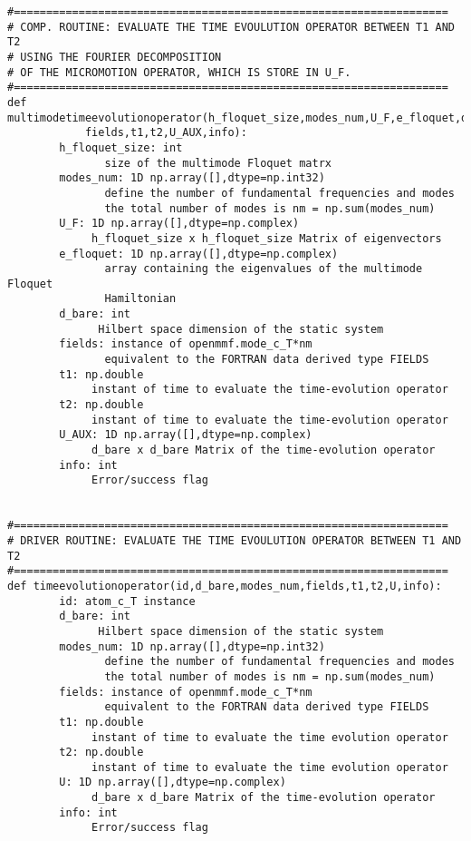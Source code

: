 \documentclass[10pt,a4paper]{article}
\begin{document}
\begin{verbatim}
#===================================================================
# COMP. ROUTINE: EVALUATE THE TIME EVOULUTION OPERATOR BETWEEN T1 AND T2 
# USING THE FOURIER DECOMPOSITION
# OF THE MICROMOTION OPERATOR, WHICH IS STORE IN U_F.
#===================================================================
def multimodetimeevolutionoperator(h_floquet_size,modes_num,U_F,e_floquet,d_bare,
            fields,t1,t2,U_AUX,info):
        h_floquet_size: int
               size of the multimode Floquet matrx
        modes_num: 1D np.array([],dtype=np.int32)
               define the number of fundamental frequencies and modes
               the total number of modes is nm = np.sum(modes_num)
        U_F: 1D np.array([],dtype=np.complex)
             h_floquet_size x h_floquet_size Matrix of eigenvectors            
        e_floquet: 1D np.array([],dtype=np.complex)
               array containing the eigenvalues of the multimode Floquet
               Hamiltonian
        d_bare: int
              Hilbert space dimension of the static system
        fields: instance of openmmf.mode_c_T*nm 
               equivalent to the FORTRAN data derived type FIELDS
        t1: np.double
             instant of time to evaluate the time-evolution operator
        t2: np.double
             instant of time to evaluate the time-evolution operator
        U_AUX: 1D np.array([],dtype=np.complex)
             d_bare x d_bare Matrix of the time-evolution operator
        info: int
             Error/success flag


#===================================================================
# DRIVER ROUTINE: EVALUATE THE TIME EVOULUTION OPERATOR BETWEEN T1 AND T2
#===================================================================
def timeevolutionoperator(id,d_bare,modes_num,fields,t1,t2,U,info):
        id: atom_c_T instance
        d_bare: int
              Hilbert space dimension of the static system
        modes_num: 1D np.array([],dtype=np.int32)
               define the number of fundamental frequencies and modes
               the total number of modes is nm = np.sum(modes_num)
        fields: instance of openmmf.mode_c_T*nm 
               equivalent to the FORTRAN data derived type FIELDS
        t1: np.double
             instant of time to evaluate the time evolution operator
        t2: np.double
             instant of time to evaluate the time evolution operator
        U: 1D np.array([],dtype=np.complex)
             d_bare x d_bare Matrix of the time-evolution operator
        info: int
             Error/success flag



\end{verbatim}
\end{document}
